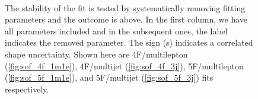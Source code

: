 \begin{figure}[htb]
\center
{}
\\
\caption{The stability of the fit is tested by systematically removing
 fitting parameters and the outcome is above.
 In the first column, we have all parameters included
 and in the subsequent ones, the label indicates the removed parameter.
 The sign (s) indicates a correlated shape uncertainty. Shown here are 
 4F/multilepton (\ref{fig:sof_4f_1m1e}), 4F/multijet (\ref{fig:sof_4f_3j}),
 5F/multilepton (\ref{fig:sof_5f_1m1e}), and 5F/multijet (\ref{fig:sof_5f_3j}) fits respectively.
 }
\label{fig:stabilityOfFits}
\end{figure}


